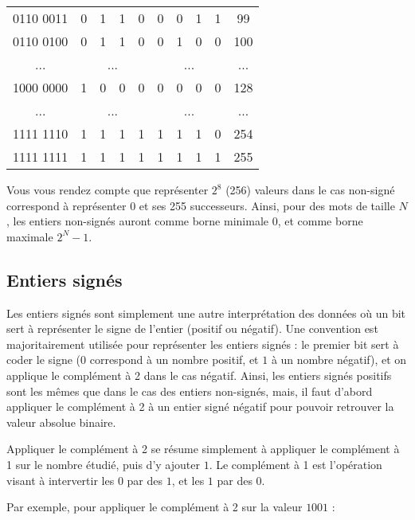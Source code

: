 \documentclass[11pt,a4paper]{article}
\begin{document}
\begin{center}
\begin{tabular}{ | c | c c c c | c c c c | c |}
0110 0011  &  0 & 1 & 1 & 0  &  0 & 0 & 1 & 1   & 99 \\
0110 0100  &  0 & 1 & 1 & 0  &  0 & 1 & 0 & 0   & 100 \\
... & \multicolumn{4}{c|}{...} & \multicolumn{4}{c|}{...} & ... \\
1000 0000  &  1 & 0 & 0 & 0  &  0 & 0 & 0 & 0   & 128 \\
... & \multicolumn{4}{c|}{...} & \multicolumn{4}{c|}{...} & ... \\
1111 1110  &  1 & 1 & 1 & 1  &  1 & 1 & 1 & 0   & 254 \\
1111 1111  &  1 & 1 & 1 & 1  &  1 & 1 & 1 & 1   & 255 \\
\hline
\end{tabular}
\end{center}

\bigskip

Vous vous rendez compte que représenter $ 2^8 $ (256) valeurs  dans le cas non-signé correspond à représenter $ 0 $ et ses 255 successeurs.
Ainsi, pour des mots de taille $ N $, les entiers non-signés auront comme borne minimale $ 0 $, et comme borne maximale $ 2^N - 1 $.

\bigskip


\subsection{Entiers signés}

\medskip

Les entiers signés sont simplement une autre interprétation des données où un bit sert à représenter le signe de l'entier (positif ou négatif).
Une convention est majoritairement utilisée pour représenter les entiers signés : le premier bit sert à coder le signe ($ 0 $ correspond à un nombre positif, et $ 1 $ à un nombre négatif), et on applique le complément à 2 dans le cas négatif.
Ainsi, les entiers signés positifs sont les mêmes que dans le cas des entiers non-signés, mais, il faut d'abord appliquer le complément à 2 à un entier signé négatif pour pouvoir retrouver la valeur absolue binaire.

\bigskip

Appliquer le complément à 2 se résume simplement à appliquer le complément à 1 sur le nombre étudié, puis d'y ajouter $ 1 $.
Le complément à 1 est l'opération visant à intervertir les $ 0 $ par des $ 1 $, et les $ 1 $ par des $ 0 $.

Par exemple, pour appliquer le complément à 2 sur la valeur $ 1001 $ :
\end{document}

